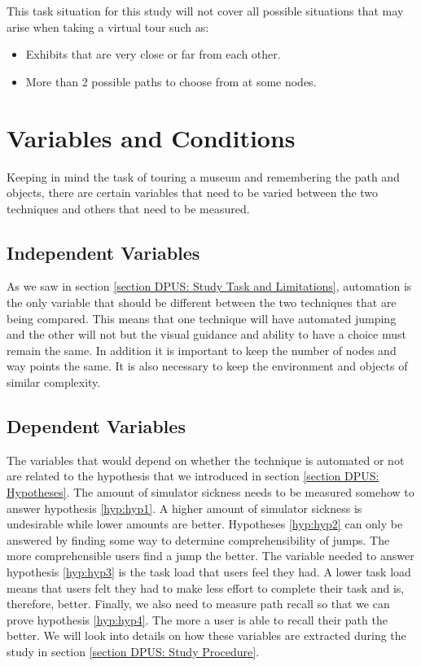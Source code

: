 This task situation for this study will not cover all possible situations that may arise when taking a virtual tour such as:
\begin{itemize}
	\item Exhibits that are very close or far from each other.
	\item More than 2 possible paths to choose from at some nodes.
\end{itemize} 

\section{Variables and Conditions}
\label{section DPUS: Variables and Conditions}
Keeping in mind the task of touring a museum and remembering the path and objects, there are certain variables that need to be varied between the two techniques and others that need to be measured. 

\subsection{Independent Variables}
\label{subsection DPUS VC: Independent Variables}
As we saw in section \ref{section DPUS: Study Task and Limitations}, automation is the only variable that should be different between the two techniques that are being compared. This means that one technique will have automated jumping and the other will not but the visual guidance and ability to have a choice must remain the same. In addition it is important to keep the number of nodes and way points the same. It is also necessary to keep the environment and objects of similar complexity. 

\subsection{Dependent Variables}
\label{subsection DPUS VC: Dependent Variables}
The variables that would depend on whether the technique is automated or not are related to the hypothesis that we introduced in section \ref{section DPUS: Hypotheses}. The amount of simulator sickness needs to be measured somehow to answer hypothesis \cref{hyp:hyp1}. A higher amount of simulator sickness is undesirable while lower amounts are better. Hypotheses \cref{hyp:hyp2} can only be answered by finding some way to determine comprehensibility of jumps. The more comprehensible users find a jump the better. The variable needed to answer hypothesis \cref{hyp:hyp3} is the task load that users feel they had. A lower task load means that users felt they had to make less effort to complete their task and is, therefore, better. Finally, we also need to measure path recall so that we can prove hypothesis \cref{hyp:hyp4}. The more a user is able to recall their path the better. We will look into details on how these variables are extracted during the study in section \ref{section DPUS: Study Procedure}.

